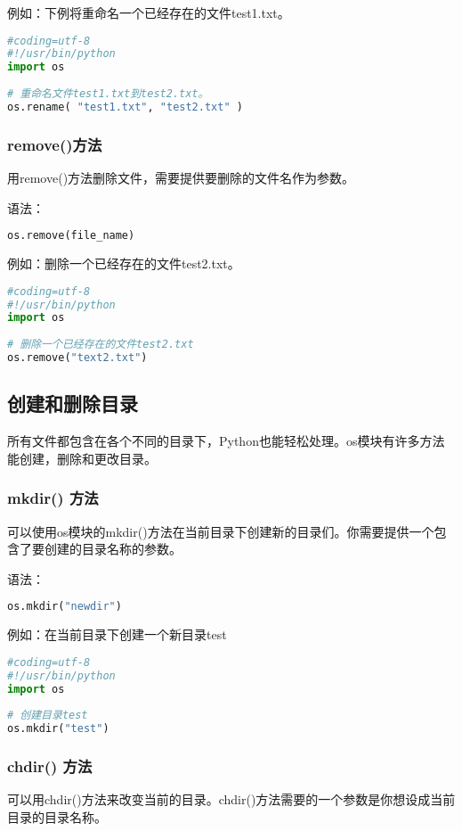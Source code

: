 例如：下例将重命名一个已经存在的文件test1.txt。
 \begin{lstlisting}[language=Python]
#coding=utf-8
#!/usr/bin/python
import os
 
# 重命名文件test1.txt到test2.txt。
os.rename( "test1.txt", "test2.txt" )
  \end{lstlisting}



\subsubsection{remove()方法}
用remove()方法删除文件，需要提供要删除的文件名作为参数。

语法：
 \begin{lstlisting}[language=Python]
os.remove(file_name)
  \end{lstlisting}

例如：删除一个已经存在的文件test2.txt。
 \begin{lstlisting}[language=Python]
#coding=utf-8
#!/usr/bin/python
import os
 
# 删除一个已经存在的文件test2.txt
os.remove("text2.txt")
  \end{lstlisting}



\subsection{创建和删除目录}
所有文件都包含在各个不同的目录下，Python也能轻松处理。os模块有许多方法能创建，删除和更改目录。
\subsubsection{mkdir() 方法}
可以使用os模块的mkdir()方法在当前目录下创建新的目录们。你需要提供一个包含了要创建的目录名称的参数。

语法：
 \begin{lstlisting}[language=Python]
os.mkdir("newdir")
  \end{lstlisting}

例如：在当前目录下创建一个新目录test
 \begin{lstlisting}[language=Python]
#coding=utf-8
#!/usr/bin/python
import os
 
# 创建目录test
os.mkdir("test")
  \end{lstlisting}



\subsubsection{chdir() 方法}
可以用chdir()方法来改变当前的目录。chdir()方法需要的一个参数是你想设成当前目录的目录名称。

